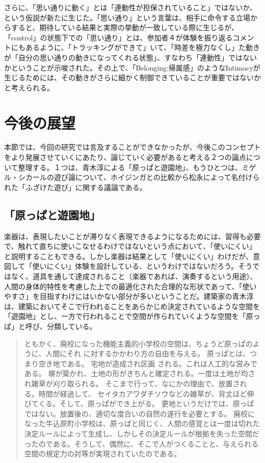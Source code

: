 さらに、「思い通りに動く」とは「連動性が担保されていること」ではないか、という仮説が新たに生じた。「思い通り」という言葉は、相手に命令する立場からすると、期待している結果と実際の挙動が一致している際に生じるが、「control」の状態下での「思い通り」とは、参加者４が体験を振り返るコメントにもあるように、「トラッキングができて」いて、「時差を極力なくし」た動きが「自分の思い通りの動きになってくれる状態」、すなわち「連動性」ではないかということが示唆された。その上で、「Belonging:帰属感」のようなIntimacyが生じるためには、その動きがさらに細かく制御できていることが重要ではないかと考えられる。

\section{今後の展望}
本節では、今回の研究では言及することができなかったが、今後このコンセプトをより発展させていくにあたり、論じていく必要があると考える２つの論点について整理する。１つは、青木淳による「原っぱと遊園地」、もうひとつは、ミゲル・シカールの遊び論について、ホイジンガとの比較から松永によって名付けられた「ふざけた遊び」に関する議論である。

\subsection{「原っぱと遊園地」}
楽器は、表現したいことが滞りなく表現できるようになるためには、習得も必要で、触れて直ちに使いこなせるわけではないという点において、「使いにくい」と説明することもできる。しかし楽器は結果として「使いにくい」わけだが、意図して「使いにくい」体験を設計している、というわけではないだろう。そうではなく、道具を通して達成されること（楽器であれば、演奏するという用途）、人間の身体的特性を考慮した上での最適化された合理的な形状であって、「使いやすさ」を目指すわけにはいかない部分が多いということだ。建築家の青木淳は、建築においてそこで行われることをあらかじめ決定されているような空間を「遊園地」とし、一方で行われることで空間が作られていくような空間を「原っぱ」と呼び、分類している。

\begin{quote}
  ともかく、廃校になった機能主義的小学校の空間は、ちょうど原っぱのように、人間にそれ に対するかかわり方の自由を与える。 原っぱとは、つまり空き地である。 宅地が造成され区画 される。これは人工的な営みである。 塀が築かれ、土地の形がきちんと確定される。一度は土地が均され雑草が刈り取られる。 そこまで行って、なにかの理由で、放置される。時間が経過して、 セイタカアワダチソウなどの雑草が、背丈ほど伸びてくる。そして、原っぱができ上がる。 更地というだけでは、原っぱではない。放置後の、適切な度合いの自然の遂行を必要とする。 
  廃校になった牛込原町小学校は、原っぱと同じく、人間の感覚とは一度は切れた決定ルールによって生成し、しかしその決定ルールが根拠を失った空間だったのである。そうして、偶然に、そこで人がつくることと、与えられる空間の規定力の対等が実現されていたのである。  
\end{quote}


